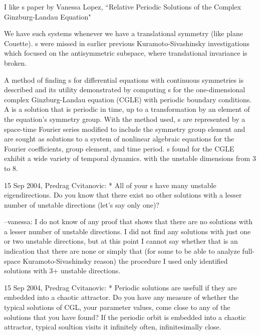 I like {\rpo s} paper by
Vanessa Lopez,
``Relative Periodic Solutions of the Complex Ginzburg-Landau Equation" 
     
We have such systems whenever we have a translational symmetry (like plane
Couette).
{\Rpo s} were missed in earlier 
previous Kuramoto-Sivashinsky investigations%
which focused on the antisymmetric subspace, where translational invariance
is broken.

     
A method of finding {\rpo s} for differential equations with 
continuous symmetries is described and its utility demonstrated by computing 
{\rpo s} for the one-dimensional complex Ginzburg-Landau 
equation (CGLE) with periodic boundary conditions.  A {\rpo} is 
a solution that is periodic in time, up to a transformation by an element of the 
equation's symmetry group.  With the method used, {\rpo s} are 
represented by a space-time Fourier series modified to include the symmetry 
group element and are sought as solutions to a system of nonlinear algebraic 
equations for the Fourier coefficients, group element, and time period. 
{\Rpo s} found for the CGLE exhibit a wide variety of temporal 
dynamics.
with the %
unstable dimensions from 3 to 8.

15 Sep 2004, Predrag Cvitanovic:
* All of your {\Rpo s} have many unstable
eigendirections. Do you know that there exist no other solutions with a
lesser number of unstable directions (let's say only one)?

--vanessa:
I do not know of any proof that shows that there are no solutions with a
lesser number of unstable directions.  I did not find any solutions with
just one or two unstable directions, but at this point I cannot say
whether that is an indication that there are none or simply that (for some
 to
be able to analyze full-space Kuramoto-Sivashinsky 
reason) the procedure I used only identified solutions with 3+ unstable
directions.

15 Sep 2004, Predrag Cvitanovic:
* Periodic solutions are usefull if they are embedded into a chaotic
attractor. Do you have any measure of whether the typical solutions of
CGL, your parameter values, come close to any of the solutions that you
have found? If the periodic orbit is embedded into a chaotic attractor,
typical soultion visits it infinitely often, infinitesimally close.


